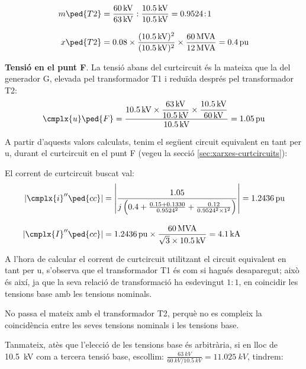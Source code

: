 \begin{exemple}[\MetodeCalculPU{}]
    \begin{align*}
    m\ped{T2} &= \frac{\qty{60}{kV}}{\qty{63}{kV}} :
    \frac{\qty{10,5}{kV}}{\qty{10,5}{kV}} = \num{0,9524}\!:\!1 \\[3mm]
    x\ped{T2} &= \num{0,08} \times \frac{(\qty{10,5}{kV})^2}{(\qty{10,5}{kV})^2} \times
    \frac{\qty{60}{MVA}}{\qty{12}{MVA}}  = \qty{0,4}{pu}
    \end{align*}

    \textbf{Tensió en el punt F}. La tensió abans del curtcircuit és la mateixa que la del generador G, elevada pel transformador T1 i reduïda després pel transformador T2:
    \[
    \cmplx{u}\ped{F} = \frac{\qty{10,5}{kV} \times
    \dfrac{\qty{63}{kV}}{\qty{10,5}{kV}} \times
    \dfrac{\qty{10,5}{kV}}{\qty{60}{kV}}}{\qty{10,5}{kV}} = \qty{1,05}{pu}
    \]

    A partir d'aquests valors calculats, tenim el següent circuit equivalent en tant per u, durant el
    curtcircuit en el punt F (vegeu la secció \ref{sec:xarxes-curtcircuits}):

    \begin{center}
       
    \end{center}

    El corrent de curtcircuit buscat val:
    \begin{align*}
    |\cmplx{i}''\ped{cc}| &= \left| \frac{\num{1,05}}{j \left( \num{0,4} + \frac{\num{0,15} + \num{0,1330}}{\num{0,9524}^2} + \frac{\num{0,12}}{\num{0,9524}^2 \times 1^2} \right)} \right| =
     \qty{1,2436}{pu} \\[3mm]
     |\cmplx{I}''\ped{cc}| &= \qty{1,2436}{pu}\times\frac{\qty{60}{MVA}}{\sqrt{3}\times \qty{10,5}{kV}} =
     \qty{4,1}{kA}
    \end{align*}

     A l'hora de calcular el corrent de curtcircuit utilitzant el circuit equivalent en tant per u,
     s'observa que el transformador T1 és com si hagués desaparegut;
     això és així, ja que la seva relació de transformació ha esdevingut
     $1\!:\!1$, en coincidir les tensions base amb les tensions nominals.

     No passa el mateix amb el transformador T2, perquè no es compleix
     la coincidència entre les seves tensions nominals i les tensions
     base.

     Tanmateix, atès que l'elecció de les tensions base és
     arbitrària, si en lloc de \qty{10,5}{kV} com a tercera tensió base,
     escollim:
     $\frac{\qty{63}{kV}}{\qty{60}{kV} / \qty{10,5}{kV}}=\qty{11,025}{kV}$,
     tindrem:


\end{exemple}
